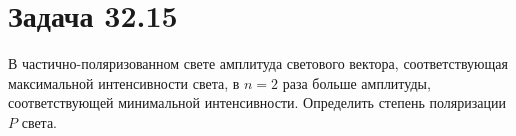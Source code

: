 \section{Задача 32.15}

В частично-поляризованном свете амплитуда светового вектора, соответствующая максимальной интенсивности света, в $n=2$ раза больше амплитуды, соответствующей минимальной интенсивности. Определить степень поляризации $P$ света.